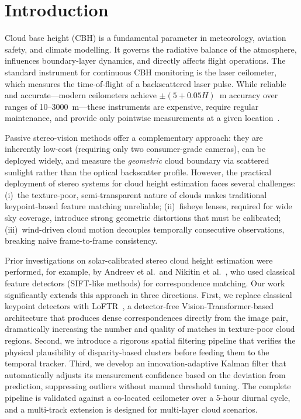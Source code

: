 \documentclass[preprint,
superscriptaddress,
amsmath,amssymb,aps,
twoside,final,secnumarabic,
nofootinbib]{revtex4-2}
\begin{document}
\par
{}

\maketitle
\thispagestyle{fancy}

\section{Introduction}\label{intro}

Cloud base height (CBH) is a fundamental parameter in meteorology, aviation safety, and climate modelling. It governs the radiative balance of the atmosphere, influences boundary-layer dynamics, and directly affects flight operations. The standard instrument for continuous CBH monitoring is the laser ceilometer, which measures the time-of-flight of a backscattered laser pulse. While reliable and accurate---modern ceilometers achieve $\pm(5 + 0.05H)$~m accuracy over ranges of 10--3000~m---these instruments are expensive, require regular maintenance, and provide only pointwise measurements at a given location~\cite{6}.

Passive stereo-vision methods offer a complementary approach: they are inherently low-cost (requiring only two consumer-grade cameras), can be deployed widely, and measure the \emph{geometric} cloud boundary via scattered sunlight rather than the optical backscatter profile. However, the practical deployment of stereo systems for cloud height estimation faces several challenges: (i)~the texture-poor, semi-transparent nature of clouds makes traditional keypoint-based feature matching unreliable; (ii)~fisheye lenses, required for wide sky coverage, introduce strong geometric distortions that must be calibrated; (iii)~wind-driven cloud motion decouples temporally consecutive observations, breaking naive frame-to-frame consistency.

Prior investigations on solar-calibrated stereo cloud height estimation were performed, for example, by Andreev et al.\ and Nikitin et al.~\cite{3,4}, who used classical feature detectors (SIFT-like methods) for correspondence matching. Our work significantly extends this approach in three directions. First, we replace classical keypoint detectors with LoFTR~\cite{1}, a detector-free Vision-Transformer-based architecture that produces dense correspondences directly from the image pair, dramatically increasing the number and quality of matches in texture-poor cloud regions. Second, we introduce a rigorous spatial filtering pipeline that verifies the physical plausibility of disparity-based clusters before feeding them to the temporal tracker. Third, we develop an innovation-adaptive Kalman filter that automatically adjusts its measurement confidence based on the deviation from prediction, suppressing outliers without manual threshold tuning. The complete pipeline is validated against a co-located ceilometer over a 5-hour diurnal cycle, and a multi-track extension is designed for multi-layer cloud scenarios.
\end{document}

